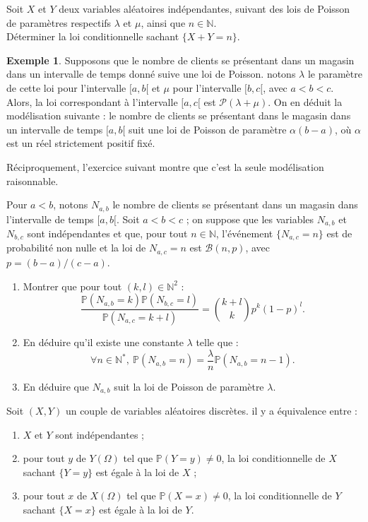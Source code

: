 \documentclass[french]{article}
\renewcommand{\P}{\mathbb{P}}
\newcommand{\N}{\mathbb{N}}
\newcommand{\st}{^*}
\theoremstyle{plain}
\theoremstyle{definition}
\newtheorem*{ex}{Exemple}
\theoremstyle{remark}
\begin{document}
\begin{exo}
	Soit $X$ et $Y$ deux variables aléatoires indépendantes, suivant des lois de Poisson de paramètres respectifs $\lambda$ et $\mu$, ainsi que $n\in\N$.\\
	Déterminer la loi conditionnelle sachant $\{X+Y=n\}$.
\end{exo}

\begin{ex}
	Supposons que le nombre de clients se présentant dans un magasin dans un intervalle de temps donné suive une loi de Poisson. notons $\lambda$ le paramètre de cette loi pour l'intervalle $[a,b[$ et $\mu$ pour l'intervalle $[b,c[$, avec $a<b<c$. Alors, la loi correspondant à l'intervalle $[a,c[$ est $\mathcal{P}(\lambda+\mu)$. On en déduit la modélisation suivante : le nombre de clients se présentant dans le magasin dans un intervalle de temps $[a,b[$ suit une loi de Poisson de paramètre $\alpha(b-a)$, où $\alpha$ est un réel strictement positif fixé.
\end{ex}

Réciproquement, l'exercice suivant montre que c'est la seule modélisation raisonnable.

\begin{exo}
	Pour $a<b$, notons $N_{a,b}$ le nombre de clients se présentant dans un magasin dans l'intervalle de temps $[a,b[$. Soit $a<b<c$ ; on suppose que les variables $N_{a,b}$ et $N_{b,c}$ sont indépendantes et que, pour tout $n\in\N$, l'événement $\{N_{a,c}=n\}$ est de probabilité non nulle et la loi de $N_{a,c}=n$ est $\mathcal{B}(n,p)$, avec $p=(b-a)/(c-a)$.
	\begin{enumerate}
		\item Montrer que pour tout $(k,l)\in\N^2$ : 
		$$\frac{\P(N_{a,b}=k)\P(N_{b,c}=l)}{\P(N_{a,c}=k+l)}=\binom{k+l}{k}p^k(1-p)^l.$$
		\item En déduire qu'il existe une constante $\lambda$ telle que :
		$$\forall n\in\N\st,\ \P(N_{a,b}=n)=\frac{\lambda}{n}\P(N_{a,b}=n-1).$$
		\item En déduire que $N_{a,b}$ suit la loi de Poisson de paramètre $\lambda$.
	\end{enumerate}
\end{exo}

\begin{prop}%
	Soit $(X,Y)$ un couple de variables aléatoires discrètes. il y a équivalence entre :
	\begin{enumerate}[label=(\roman*)]
		\item $X$ et $Y$ sont indépendantes ;
		\item pour tout $y$ de $Y(\Omega)$ tel que $\P(Y=y)\ne0$, la loi conditionnelle de $X$ sachant $\{Y=y\}$ est égale à la loi de $X$ ;
		\item pour tout $x$ de $X(\Omega)$ tel que $\P(X=x)\ne0$, la loi conditionnelle de $Y$ sachant $\{X=x\}$ est égale à la loi de $Y$.
	\end{enumerate}
\end{prop}
\end{document}
